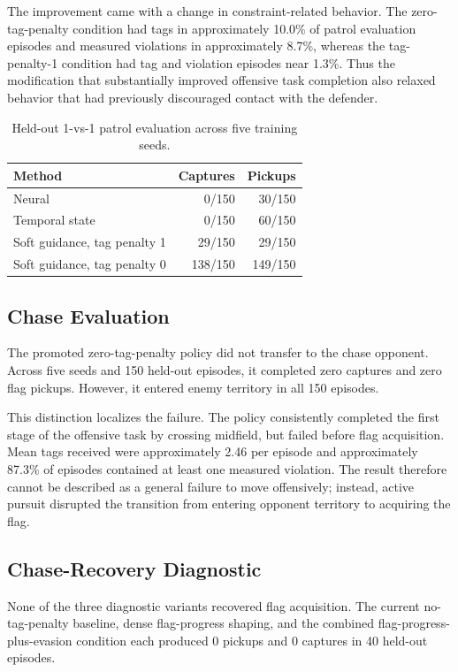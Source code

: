 \documentclass[letterpaper]{article}
\begin{document}
The improvement came with a change in constraint-related behavior. The zero-tag-penalty condition had tags in approximately 10.0\% of patrol evaluation episodes and measured violations in approximately 8.7\%, whereas the tag-penalty-1 condition had tag and violation episodes near 1.3\%. Thus the modification that substantially improved offensive task completion also relaxed behavior that had previously discouraged contact with the defender.

\begin{table}[htbp]
\centering
\small
\begin{tabular}{lrr}
\hline
Method & Captures & Pickups \\
\hline
Neural & 0/150 & 30/150 \\
Temporal state & 0/150 & 60/150 \\
Soft guidance, tag penalty 1 & 29/150 & 29/150 \\
Soft guidance, tag penalty 0 & 138/150 & 149/150 \\
\hline
\end{tabular}
\caption{Held-out 1-vs-1 patrol evaluation across five training seeds.}
\label{tab:patrol}
\end{table}

\subsection{Chase Evaluation}

The promoted zero-tag-penalty policy did not transfer to the chase opponent. Across five seeds and 150 held-out episodes, it completed zero captures and zero flag pickups. However, it entered enemy territory in all 150 episodes.

This distinction localizes the failure. The policy consistently completed the first stage of the offensive task by crossing midfield, but failed before flag acquisition. Mean tags received were approximately 2.46 per episode and approximately 87.3\% of episodes contained at least one measured violation. The result therefore cannot be described as a general failure to move offensively; instead, active pursuit disrupted the transition from entering opponent territory to acquiring the flag.

\subsection{Chase-Recovery Diagnostic}

None of the three diagnostic variants recovered flag acquisition. The current no-tag-penalty baseline, dense flag-progress shaping, and the combined flag-progress-plus-evasion condition each produced 0 pickups and 0 captures in 40 held-out episodes.
\end{document}
